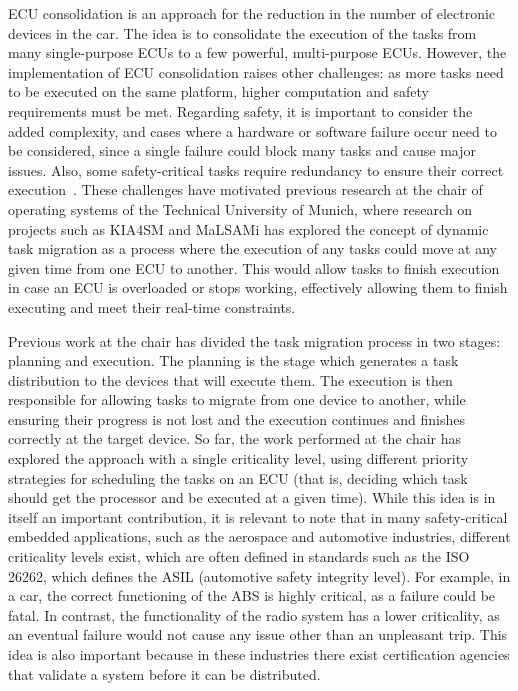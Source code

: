 ECU consolidation is an approach for the reduction in the number of electronic devices in the car. The idea is to consolidate the execution of the tasks from many single-purpose ECUs to a few powerful, multi-purpose ECUs. However, the implementation of ECU consolidation raises other challenges: as more tasks need to be executed on the same platform, higher computation and safety requirements must be met. Regarding safety, it is important to consider the added complexity, and cases where a hardware or software failure occur need to be considered, since a single failure could block many tasks and cause major issues. Also, some safety-critical tasks require redundancy to ensure their correct execution~\parencite{mundhenk1}. These challenges have motivated previous research at the chair of operating systems of the Technical University of Munich, where research on projects such as KIA4SM and MaLSAMi has explored the concept of dynamic task migration as a process where the execution of any tasks could move at any given time from one ECU to another. This would allow tasks to finish execution in case an ECU is overloaded or stops working, effectively allowing them to finish executing and meet their real-time constraints.

Previous work at the chair has divided the task migration process in two stages: planning and execution. The planning is the stage which generates a task distribution to the devices that will execute them. The execution is then responsible for allowing tasks to migrate from one device to another, while ensuring their progress is not lost and the execution continues and finishes correctly at the target device. So far, the work performed at the chair has explored the approach with a single criticality level, using different priority strategies for scheduling the tasks on an ECU (that is, deciding which task should get the processor and be executed at a given time). While this idea is in itself an important contribution, it is relevant to note that in many safety-critical embedded applications, such as the aerospace and automotive industries, different criticality levels exist, which are often defined in standards such as the ISO 26262, which defines the ASIL (automotive safety integrity level). For example, in a car, the correct functioning of the ABS is highly critical, as a failure could be fatal. In contrast, the functionality of the radio system has a lower criticality, as an eventual failure would not cause any issue other than an unpleasant trip. This idea is also important because in these industries there exist certification agencies that validate a system before it can be distributed.

